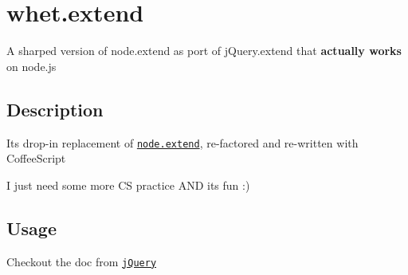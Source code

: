 \href{http://travis-ci.org/Meettya/whet.extend}{\tt }

\section*{whet.\+extend}

A sharped version of node.\+extend as port of j\+Query.\+extend that {\bfseries actually works} on node.\+js

\subsection*{Description}

Its drop-\/in replacement of \href{https://github.com/dreamerslab/node.extend}{\tt node.\+extend}, re-\/factored and re-\/written with Coffee\+Script

I just need some more CS practice A\+ND its fun \+:)

\subsection*{Usage}

Checkout the doc from \href{http://api.jquery.com/jQuery.extend/}{\tt j\+Query} 